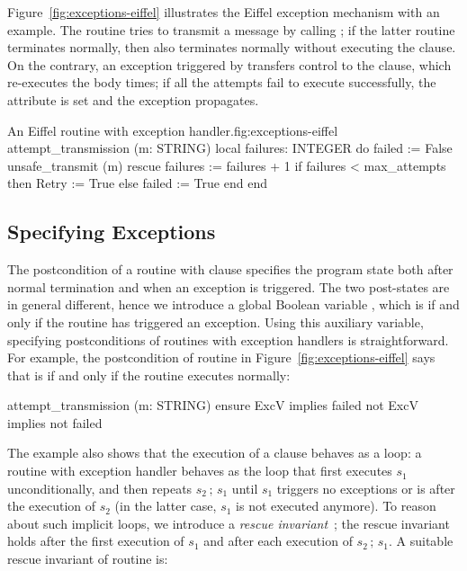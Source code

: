 Figure~\ref{fig:exceptions-eiffel} illustrates the Eiffel exception mechanism with an example. 
The routine  tries to transmit a message by calling ; if the latter routine terminates normally, then also  terminates normally without executing the  clause.
On the contrary, an exception triggered by  transfers control to the  clause, which re-executes the body  times; if all the attempts fail to execute successfully, the attribute  is set and the exception propagates. 

\begin{efigure}[ht]{An Eiffel routine with exception handler.}{fig:exceptions-eiffel}
attempt_transmission (m: STRING)
	local
		failures: INTEGER
	do
		failed := False
		unsafe_transmit (m)
	rescue
		failures := failures + 1
		if failures < max_attempts then
			Retry := True
		else
			failed := True
		end
	end
\end{efigure}




\subsection{Specifying Exceptions} \label{sec:m-exceptions:spec-except}


The postcondition of a routine with  clause specifies the program state both after normal termination and when an exception is triggered. 
The two post-states are in general different, hence we introduce a global Boolean variable , which is  if and only if the routine has triggered an exception.
Using this auxiliary variable, specifying postconditions of routines with exception handlers is straightforward.
For example, the postcondition of routine  in Figure~\ref{fig:exceptions-eiffel} says that  is  if and only if the routine executes normally:

\begin{erunning}
attempt_transmission (m: STRING)
	ensure
		ExcV implies failed
		not ExcV implies not failed
\end{erunning} 

The example also shows that the execution of a  clause behaves as a loop: a routine  with exception handler  behaves as the loop that first executes $s_1$ unconditionally, and then repeats $s_2 \,;\, s_1$ until $s_1$ triggers no exceptions or  is  after the execution of $s_2$ (in the latter case, $s_1$ is not executed anymore).
To reason about such implicit loops, we introduce a \emph{rescue invariant}~\cite{NORDIO09-2,NORDIO08}; the rescue invariant holds after the first execution of $s_1$ and after each execution of $s_2\,;\,s_1$.
A suitable rescue invariant of routine  is:

